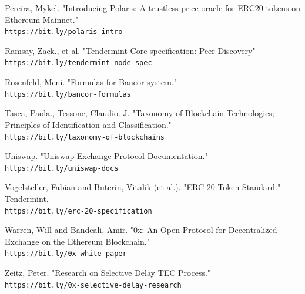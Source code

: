 \documentclass[10pt]{article}
\begin{document}
\begin{thebibliography}{9}
Pereira, Mykel. "Introducing Polaris: A trustless price oracle for ERC20 tokens on Ethereum Mainnet."
\\\texttt{https://bit.ly/polaris-intro}

Ramsay, Zack., et al. "Tendermint Core specification: Peer Discovery"
\\\texttt{https://bit.ly/tendermint-node-spec}

Rosenfeld, Meni. "Formulas for Bancor system."
\\\texttt{https://bit.ly/bancor-formulas}

Tasca, Paola., Tessone, Claudio. J. "Taxonomy of Blockchain Technologies; Principles of Identification and Classification."
\\\texttt{https://bit.ly/taxonomy-of-blockchains}

Uniswap. "Uniswap Exchange Protocol Documentation."
\\\texttt{https://bit.ly/uniswap-docs}

Vogelsteller, Fabian and Buterin, Vitalik (et al.). "ERC-20 Token Standard." Tendermint.
\\\texttt{https://bit.ly/erc-20-specification}

Warren, Will and Bandeali, Amir. "0x: An Open Protocol for Decentralized Exchange on the Ethereum Blockchain."
\\\texttt{https://bit.ly/0x-white-paper}

Zeitz, Peter. "Research on Selective Delay TEC Process."
\\\texttt{https://bit.ly/0x-selective-delay-research}

\end{thebibliography}


\end{document}
